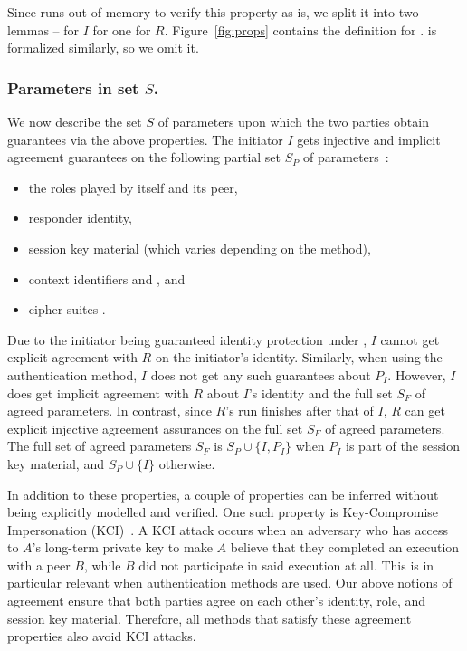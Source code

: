 Since \mTamarin{} runs out of memory to verify this property as is,
we split it into two lemmas -- \mPredImpI{} for $I$ for one \mPredImpR{} for $R$.
%
Figure~\ref{fig:props} contains the definition for \mPredImpI{}.
%
\mPredImpR{} is formalized similarly, so we omit it.
%

\subsubsection{Parameters in set $S$.}
\label{sec:agreedParams}
We now describe the set $S$ of parameters upon which the two parties obtain
guarantees via the above properties.
%
The initiator $I$ gets injective and implicit agreement guarantees on the
following partial set $S_P$ of parameters~\cite{Norr21}:
\begin{itemize}
    \item the roles played by itself and its peer,
    \item responder identity,
    \item session key material (which varies depending on the \mEdhoc{} method),
    \item context identifiers \mCi{} and \mCr{}, and
    \item cipher suites \mSuites{}.
\end{itemize}
%

Due to the initiator being guaranteed identity protection under \mEdhoc{}, $I$
cannot get explicit agreement with $R$ on the initiator's identity.
%
Similarly, when using the \mStat{} authentication method, $I$ does not get any
such guarantees about $P_{I}$.
%
However, $I$ does get implicit agreement with $R$ about $I$'s identity and the
full set $S_{F}$ of agreed parameters.
%
In contrast, since $R$'s run finishes after that of $I$, $R$ can get explicit
injective agreement assurances on the full set $S_{F}$ of agreed parameters.
%
The full set of agreed parameters $S_F$ is $S_P \cup \{I, P_I\}$ when $P_I$
is part of the session key material, and $S_P \cup \{I\}$ otherwise.
%

In addition to these properties, a couple of properties can be inferred
without being explicitly modelled and verified.
%
One such property is Key-Compromise Impersonation
(KCI)~\cite{DBLP:conf/ima/Blake-WilsonJM97}.
%
A KCI attack occurs when an adversary who has access to $A$'s long-term private
key to make $A$ believe that they completed an execution with a peer $B$,
while $B$ did not participate in said execution at all.
%
This is in particular relevant when \mStat{} authentication methods are used.
%
Our above notions of agreement ensure that both parties agree on each
other's identity, role, and session key material.
%
Therefore, all \mEdhoc{} methods that satisfy these agreement properties also
avoid KCI attacks.
%

